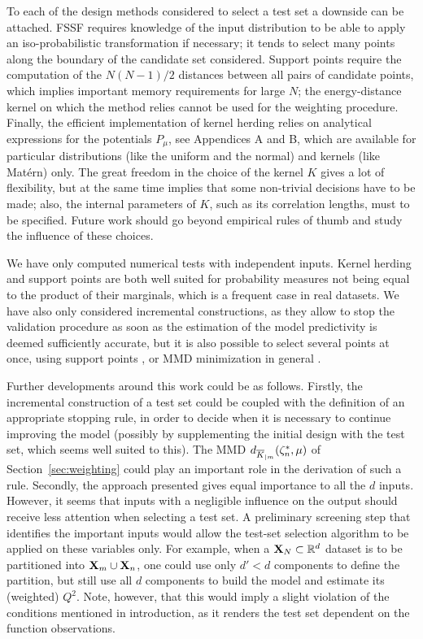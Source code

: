 To each of the design methods considered to select a test set a downside can be attached. 
FSSF requires knowledge of the input distribution to be able to apply an iso-probabilistic transformation if necessary; it tends to select many points along the boundary of the candidate set considered. 
Support points require the computation of the $N(N-1)/2$ distances between all pairs of candidate points, which implies important memory requirements for large $N$; the energy-distance kernel on which the method relies cannot be used for the weighting procedure. 
Finally, the efficient implementation of kernel herding relies on analytical expressions for the potentials $P_{\mu}$, see Appendices A and B, which are available for particular distributions (like the uniform and the normal) and kernels (like Matérn) only. 
The great freedom in the choice of the kernel $K$ gives a lot of flexibility, but at the same time implies that some non-trivial decisions have to be made; also, the internal parameters of $K$, such as its correlation lengths, must to be specified. 
Future work should go beyond empirical rules of thumb and study the influence of these choices.

We have only computed numerical tests with independent inputs. 
Kernel herding and support points are both well suited for probability measures not being equal to the product of their marginals, which is a frequent case in real datasets. 
We have also only considered incremental constructions, as they allow to stop the validation procedure as soon as the estimation of the model predictivity is deemed sufficiently accurate, but it is also possible to select several points at once, using support points \cite{mak_joseph_2018}, or MMD minimization in general \cite{TeymurGRO2021}. 

Further developments around this work could be as follows. 
Firstly, the incremental construction of a test set could be coupled with the definition of an appropriate stopping rule, in order to decide when it is necessary to continue improving the model (possibly by supplementing the initial design with the test set, which seems well suited to this). 
The MMD $d_{\overline{K}_{|m}}(\zeta_n^*,\mu)$ of Section~\ref{sec:weighting} could play an important role in the derivation of such a rule. 
Secondly, the approach presented gives equal importance to all the $d$ inputs. 
However, it seems that inputs with a negligible influence on the output should receive less attention when selecting a test set. 
A preliminary screening step that identifies the important inputs would allow the test-set selection algorithm to be applied on these variables only. 
For example, when a ${\bf X}_N\subset\mathbb{R}^d$ dataset is to be partitioned into ${\bf X}_m\cup{\bf X}_n$, one could use only $d'<d$ components to define the partition, but still use all $d$ components to build the model and estimate its (weighted) $Q^2$. 
Note, however, that this would imply a slight violation of the conditions mentioned in introduction, as it renders the test set dependent on the function observations. 

